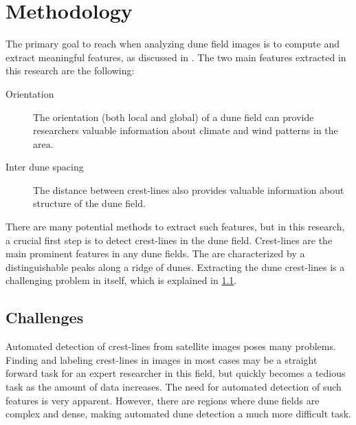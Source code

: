 \section{Methodology} \label{sec:methodology}
The primary goal to reach when analyzing dune field images is to compute and extract meaningful features, as discussed in \cite{ewing-kocurek-lake-2006,ewing-peyret-kocurek-bourke-2010}. The two main features extracted in this research are the following:

 \begin{description}
 	\item [Orientation] The orientation (both local and global) of a dune field can provide researchers valuable information about climate and wind patterns in the area.
 	\item [Inter dune spacing] The distance between crest-lines also provides valuable information about structure of the dune field.
 \end{description}
 
 There are many potential methods to extract such features, but in this research, a crucial first step is to detect crest-lines in the dune field. Crest-lines are the main prominent features in any dune fields. The are characterized by a distinguishable peaks along a ridge of dunes. Extracting the dune crest-lines is a challenging problem in itself, which is explained in \ref{subsec:challenges}. 

 
 \subsection{Challenges} \label{subsec:challenges}
 
 Automated detection of crest-lines from satellite images poses many problems. Finding and labeling crest-lines in images in most cases may be a straight forward task for an expert researcher in this field, but quickly becomes a tedious task as the amount of data increases. The need for automated detection of such features is very apparent. However, there are regions where dune fields are complex and dense, making automated dune detection a much more difficult task.
 

